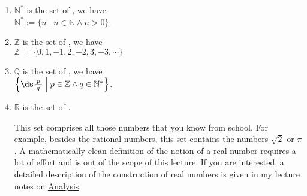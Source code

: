 \begin{enumerate}
\item $\mathbb{N}^*$ is the set of ,  we have
      \\[0.2cm]
      \hspace*{1.3cm}
      $\mathbb{N}^* := \{ n \mid n \in \mathbb{N} \wedge n > 0 \}$.
\item $\mathbb{Z}$ is the set of , we have
      \\[0.2cm]
      \hspace*{1.3cm}
      $\mathbb{Z} \ = \{ 0, 1, -1, 2, -2, 3, -3, \cdots \}$ 

\item $\mathbb{Q}$ is the set of , we have
      \\[0.2cm]
      \hspace*{1.3cm}
      $\Bigl\{ \ds\frac{\;p\;}{q} \Bigm| p \in \mathbb{Z} \wedge q \in \mathbb{N}^* \Bigr\}$.
\item $\mathbb{R}$ is the set of .  

      This set comprises all those numbers that you know from school.  For example, besides the rational numbers,
      this set contains the numbers $\sqrt{2}$ or $\pi$.
      A mathematically clean definition of the notion of a \href{https://en.wikipedia.org/wiki/Real_number}{real number}
      requires a lot of effort and is out of the scope of this lecture.  If you are interested, a detailed
      description of the construction of real numbers is given in my lecture notes on 
      \href{https://github.com/karlstroetmann/Analysis/blob/master/Skript/analysis.pdf}{Analysis}.
\end{enumerate}

